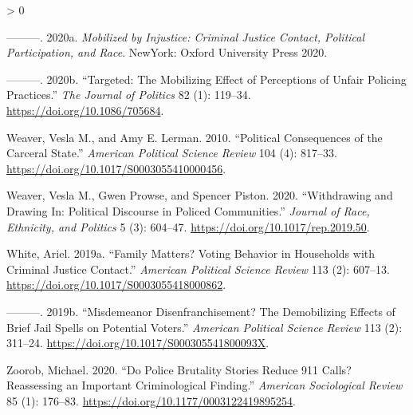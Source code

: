 \documentclass[
  12pt,
]{article}
\newlength{\cslhangindent}
\newenvironment{CSLReferences}[2] %
 {%
  \setlength{\parindent}{0pt}
  \ifodd #1 \everypar{\setlength{\hangindent}{\cslhangindent}}\ignorespaces\fi
  \ifnum #2 > 0
  \setlength{\parskip}{#2\baselineskip}
  \fi
 }%
 {}
\begin{document}
\begin{CSLReferences}{1}{0}
\leavevmode\hypertarget{ref-Walker2020}{}%
---------. 2020a. \emph{Mobilized by Injustice: Criminal Justice Contact, Political Participation, and Race}. {NewYork}: {Oxford University Press 2020}.

\leavevmode\hypertarget{ref-Walker2020a}{}%
---------. 2020b. {``Targeted: {The Mobilizing Effect} of {Perceptions} of {Unfair Policing Practices}.''} \emph{The Journal of Politics} 82 (1): 119--34. \url{https://doi.org/10.1086/705684}.

\leavevmode\hypertarget{ref-Weaver2010}{}%
Weaver, Vesla M., and Amy E. Lerman. 2010. {``Political {Consequences} of the {Carceral State}.''} \emph{American Political Science Review} 104 (4): 817--33. \url{https://doi.org/10.1017/S0003055410000456}.

\leavevmode\hypertarget{ref-Weaver2020}{}%
Weaver, Vesla M., Gwen Prowse, and Spencer Piston. 2020. {``Withdrawing and {Drawing In}: {Political Discourse} in {Policed Communities}.''} \emph{Journal of Race, Ethnicity, and Politics} 5 (3): 604--47. \url{https://doi.org/10.1017/rep.2019.50}.

\leavevmode\hypertarget{ref-White2019}{}%
White, Ariel. 2019a. {``Family {Matters}? {Voting Behavior} in {Households} with {Criminal Justice Contact}.''} \emph{American Political Science Review} 113 (2): 607--13. \url{https://doi.org/10.1017/S0003055418000862}.

\leavevmode\hypertarget{ref-White2019a}{}%
---------. 2019b. {``Misdemeanor {Disenfranchisement}? {The Demobilizing Effects} of {Brief Jail Spells} on {Potential Voters}.''} \emph{American Political Science Review} 113 (2): 311--24. \url{https://doi.org/10.1017/S000305541800093X}.

\leavevmode\hypertarget{ref-Zoorob2020}{}%
Zoorob, Michael. 2020. {``Do {Police Brutality Stories Reduce} 911 {Calls}? {Reassessing} an {Important Criminological Finding}.''} \emph{American Sociological Review} 85 (1): 176--83. \url{https://doi.org/10.1177/0003122419895254}.

\end{CSLReferences}
\end{document}
